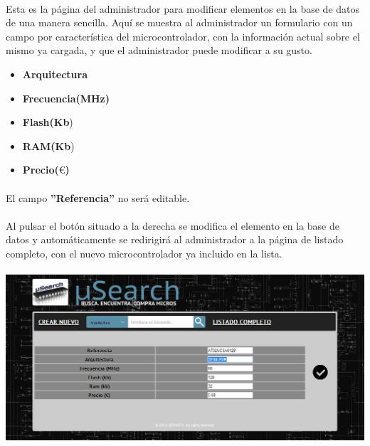 \paragraph{} Esta es la página del administrador para modificar elementos en la base de datos de una manera sencilla. Aquí se muestra al administrador un formulario con un campo por característica del microcontrolador, con la información actual sobre el mismo ya cargada, y que el administrador puede modificar a su gusto.
\begin{itemize}
\item \textbf{Arquitectura}
\item \textbf{Frecuencia(MHz)}
\item \textbf{Flash(Kb})
\item \textbf{RAM(Kb}) 
\item \textbf{Precio($\euro$)}
\end{itemize}

\paragraph{} El campo \textbf{''Referencia''} no será editable.

\paragraph{} Al pulsar el botón situado a la derecha se modifica el elemento en la base de datos y automáticamente se redirigirá al administrador a la página de listado completo, con el nuevo microcontrolador ya incluido en la lista.

\begin{center}
	\paragraph{}\includegraphics[scale=0.35]{img/editar}\singlelinebreak
\end{center}

